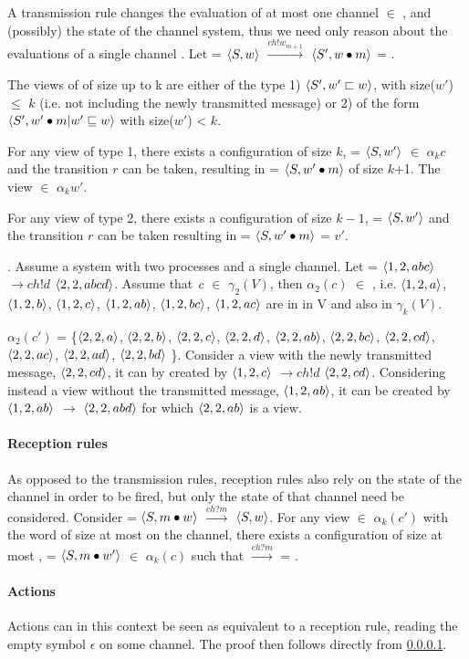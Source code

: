 A transmission rule changes the evaluation of at most one channel  $\in$ , and (possibly) the state of the channel system, thus we need only reason about the evaluations of a single channel .
Let  = $\langle S, w\rangle$ $\xrightarrow{ch!w_{m+1}}$ $\langle S', w \bullet m\rangle$ = .

The views of  of size up to k are either of the type 1) $\langle S', w' \sqsubset w\rangle$, with size($w'$) $\leq$ $k$ (i.e. not including the newly transmitted message) or 2) of the form $\langle S', w' \bullet m | w' \sqsubseteq w\rangle$ with size($w'$) < $k$.

For any view of type 1, there exists a configuration of size $k$,  = $\langle S, w'\rangle$ $\in$ $\alpha_k{c}$ and the transition $r$ can be taken, resulting in  = $\langle S, w'\bullet m\rangle$ of size $k$+1. The view  $\in$ $\alpha_k{w'}$.

For any view of type 2, there exists a configuration of size $k-1$,  = $\langle S, w'\rangle$ and the transition $r$ can be taken resulting in  = $\langle S, w'\bullet m\rangle$ = $v'$.

. Assume a system with two processes and a single channel. Let  = $\langle1,2,abc\rangle$ $\rightarrow{ch!d}$ $\langle2,2,abcd\rangle$. Assume that $\emph{c}$ $\in$ $\gamma_2(V)$, then $\alpha_2(c)$ $\in$ , i.e. 
$\langle1,2,a\rangle$, $\langle1,2,b\rangle$, $\langle1,2,c\rangle$, $\langle1,2,ab\rangle$, $\langle1,2,bc\rangle$, $\langle1,2,ac\rangle$ are in in V and also in $\gamma_k(V)$.

$\alpha_2(c')$ = \{$\langle2,2,a\rangle$, $\langle2,2,b\rangle$, $\langle2,2,c\rangle$, $\langle2,2,d\rangle$, $\langle2,2,ab\rangle$, $\langle2,2,bc\rangle$, $\langle2,2,cd\rangle$, $\langle2,2,ac\rangle$, $\langle2,2,ad\rangle$, $\langle2,2,bd\rangle $ \}. Consider a view with the newly transmitted message, $\langle2,2,cd\rangle$, it can by created by $\langle1,2,c\rangle$ $\rightarrow{ch!d}$ $\langle2,2,cd\rangle$. Considering instead a view without the transmitted message, $\langle1,2,ab\rangle$, it can be created by $\langle1,2,ab\rangle$ $\rightarrow$ $\langle2,2,abd\rangle$ for which $\langle2,2,ab\rangle$ is a view.

\paragraph{Reception rules}
\label{proofreception}
As opposed to the transmission rules, reception rules also rely on the state of the channel in order to be fired, but only the state of that channel need be considered. Consider  = $\langle S, m\bullet w\rangle$ $\xrightarrow{ch?m}$ $\langle S, w\rangle$. For any view  $\in$ $\alpha_k(c')$ with the word  of size at most  on the channel, there exists a configuration of size at most ,  = $\langle S, m\bullet w'\rangle$ $\in$ $\alpha_k(c)$ such that  $\xrightarrow{ch?m}$  = .

\paragraph{Actions}
Actions can in this context be seen as equivalent to a reception rule, reading the empty symbol $\epsilon$ on some channel. The proof then follows directly from \ref{proofreception}.
